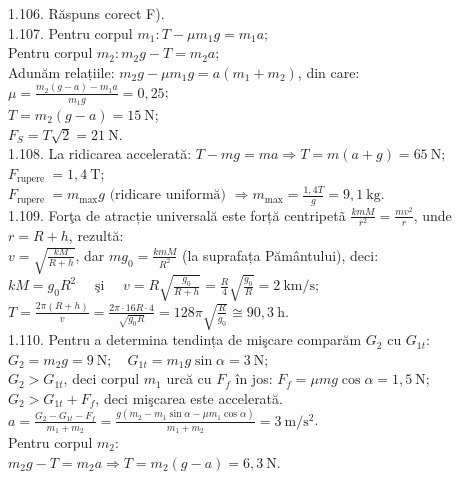 1.106. Răspuns corect F).\\

1.107. Pentru corpul $m_{1}: T-\mu m_{1} g=m_{1} a$;\\ Pentru corpul $m_{2}: m_{2} g-T=m_{2} a$;\\ Adunăm relațiile: $m_{2} g-\mu m_{1} g=a\left(m_{1}+m_{2}\right)$, din care:\\ $\mu=\frac{m_{2}(g-a)-m_{1} a}{m_{1} g}=0,25$;\\ $T=m_{2}(g-a)=15 \mathrm{~N}$;\\ $F_{S}=T \sqrt{2}=21 \mathrm{~N}$.\\

1.108. La ridicarea accelerată: $T-m g=m a \Rightarrow T=m(a+g)=65 \mathrm{~N};$\\ $F_{\text {rupere }}=1,4 \mathrm{~T}$;\\ $F_{\text {rupere }}=m_{\max } g \text { (ridicare uniformă) } \Rightarrow m_{\max }=\frac{1,4 T}{g}=9,1 \mathrm{~kg}$.\\

1.109. Forţa de atracție universală este forță centripetã $\frac{k m M}{r^{2}}=\frac{m v^{2}}{r}$, unde $r=R+h$, rezultă:\\ $v=\sqrt{\frac{k M}{R+h}}$, dar $m g_{0}=\frac{k m M}{R^{2}}$ (la suprafața Pământului), deci:\\ $k M=g_{0} R^{2} \quad \text { şi } \quad v=R \sqrt{\frac{g_{0}}{R+h}}=\frac{R}{4} \sqrt{\frac{g_{0}}{R}}=2 \mathrm{~km} / \mathrm{s}$;\\ $T=\frac{2 \pi(R+h)}{v}=\frac{2 \pi \cdot 16 R \cdot 4}{\sqrt{g_{0} R}}=128 \pi \sqrt{\frac{R}{g_{0}}} \cong 90,3 \mathrm{~h}$.\\

1.110. Pentru a determina tendința de mişcare comparăm $G_{2}$ cu $G_{1 t}$:\\ $G_{2}=m_{2} g=9 \mathrm{~N}; \quad G_{1 t}=m_{1} g \sin \alpha=3 \mathrm{~N}$;\\ $G_{2}>G_{1 t}$, deci corpul $m_{1}$ urcă cu $F_{f}$ în jos: $F_{f}=\mu m g \cos \alpha=1,5 \mathrm{~N}$;\\ $G_{2}>G_{1 t}+F_{f}$, deci mişcarea este accelerată.\\ $a=\frac{G_{2}-G_{1 t}-F_{f}}{m_{1}+m_{2}}=\frac{g\left(m_{2}-m_{1} \sin \alpha-\mu m_{1} \cos \alpha\right)}{m_{1}+m_{2}}=3 \mathrm{~m} / \mathrm{s}^{2}$.\\ Pentru corpul $m_{2}$:\\ $m_{2} g-T=m_{2} a \Rightarrow T=m_{2}(g-a)=6,3 \mathrm{~N}$.\\

